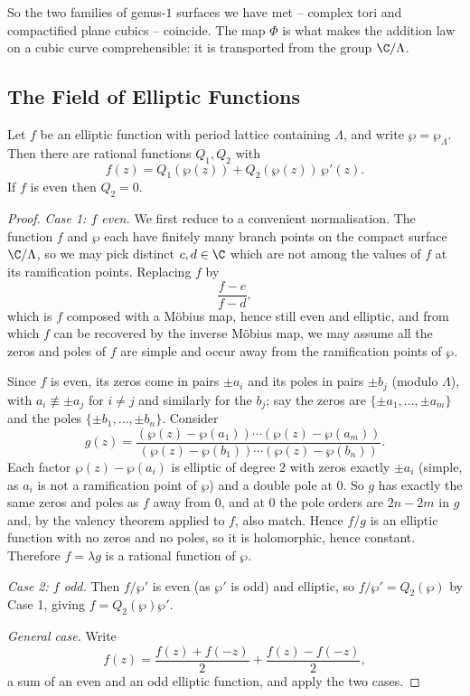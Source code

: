 So the two families of genus-$1$ surfaces we have met -- complex tori and compactified
plane cubics -- coincide. The map $\Phi$ is what makes the addition law on a cubic curve
comprehensible: it is transported from the group $\C/\Lambda$.

\subsection{The Field of Elliptic Functions}

\begin{theorem}\label{thm:ellipticfield}
	Let $f$ be an elliptic function with period lattice containing $\Lambda$, and write
	$\wp = \wp_\Lambda$. Then there are rational functions $Q_1, Q_2$ with
	$$
	f(z) = Q_1(\wp(z)) + Q_2(\wp(z))\,\wp'(z).
	$$
	If $f$ is even then $Q_2 = 0$.
\end{theorem}

\begin{proof}
	\emph{Case 1: $f$ even.} We first reduce to a convenient normalisation. The function $f$
	and $\wp$ each have finitely many branch points on the compact surface $\C/\Lambda$, so
	we may pick distinct $c, d\in\C$ which are not among the values of $f$ at its
	ramification points. Replacing $f$ by
	$$
	\frac{f - c}{f - d},
	$$
	which is $f$ composed with a M\"obius map, hence still even and elliptic, and from which
	$f$ can be recovered by the inverse M\"obius map, we may assume all the zeros and poles
	of $f$ are simple and occur away from the ramification points of $\wp$.

	Since $f$ is even, its zeros come in pairs $\pm a_i$ and its poles in pairs $\pm b_j$
	(modulo $\Lambda$), with $a_i \not\equiv \pm a_j$ for $i \neq j$ and similarly for the
	$b_j$; say the zeros are $\{\pm a_1,\dots,\pm a_m\}$ and the poles
	$\{\pm b_1,\dots,\pm b_n\}$. Consider
	$$
	g(z) = \frac{(\wp(z)-\wp(a_1))\cdots(\wp(z)-\wp(a_m))}{(\wp(z)-\wp(b_1))\cdots(\wp(z)-\wp(b_n))}.
	$$
	Each factor $\wp(z)-\wp(a_i)$ is elliptic of degree $2$ with zeros exactly $\pm a_i$
	(simple, as $a_i$ is not a ramification point of $\wp$) and a double pole at $0$. So $g$
	has exactly the same zeros and poles as $f$ away from $0$, and at $0$ the pole orders are
	$2n - 2m$ in $g$ and, by the valency theorem applied to $f$, also match. Hence $f/g$ is
	an elliptic function with no zeros and no poles, so it is holomorphic, hence constant.
	Therefore $f = \lambda g$ is a rational function of $\wp$.

	\emph{Case 2: $f$ odd.} Then $f/\wp'$ is even (as $\wp'$ is odd) and elliptic, so
	$f/\wp' = Q_2(\wp)$ by Case 1, giving $f = Q_2(\wp)\wp'$.

	\emph{General case.} Write
	$$
	f(z) = \frac{f(z)+f(-z)}{2} + \frac{f(z)-f(-z)}{2},
	$$
	a sum of an even and an odd elliptic function, and apply the two cases.
\end{proof}

